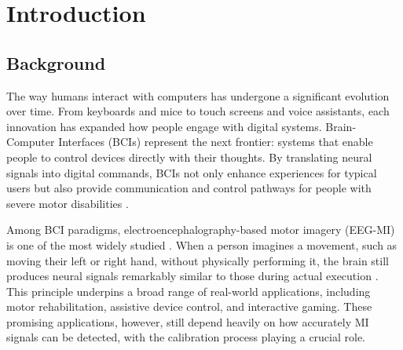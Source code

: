 \documentclass[a4paper, 11pt, openany]{report}
\let\cite\citep
\begin{document}
\reportTableOfContents

\reportListOfFigures

\reportListOfTables


\cleardoublepage
{}

\setlength{\parskip}{10pt plus 2pt minus 1pt} 


\vspace*{-1.15cm}
\chapter{Introduction}

    \section{Background}

    The way humans interact with computers has undergone a significant evolution over time. From keyboards and mice to touch screens and voice assistants, each innovation has expanded how people engage with digital systems. Brain-Computer Interfaces (BCIs) represent the next frontier: systems that enable people to control devices directly with their thoughts. By translating neural signals into digital commands, BCIs not only enhance experiences for typical users but also provide communication and control pathways for people with severe motor disabilities \cite{wolpaw2002brain, kubler2001brain}.  
    
    Among BCI paradigms, electroencephalography-based motor imagery (EEG-MI) is one of the most widely studied \cite{lotte2018review}. When a person imagines a movement, such as moving their left or right hand, without physically performing it, the brain still produces neural signals remarkably similar to those during actual execution \cite{jeannerod1995mental, neuper2001event}. This principle underpins a broad range of real-world applications, including motor rehabilitation, assistive device control, and interactive gaming. These promising applications, however, still depend heavily on how accurately MI signals can be detected, with the calibration process playing a crucial role.
\end{document}
